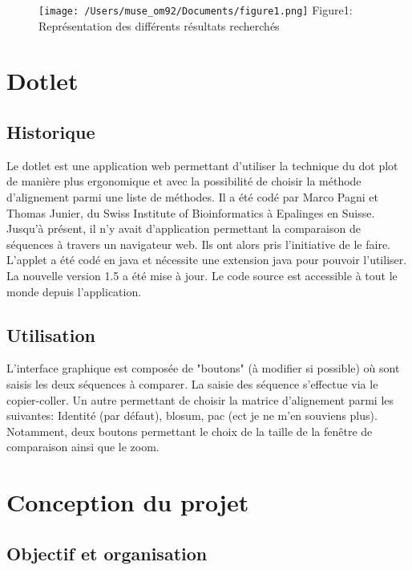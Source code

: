 \documentclass{report}
\begin{document}

\begin{figure}[!h]
\centering
\texttt{[image: /Users/muse\_om92/Documents/figure1.png]}
Figure1: Représentation des différents résultats recherchés
\end{figure}


\chapter{Dotlet}

\section{Historique}

Le dotlet est une application web permettant d'utiliser la technique du dot plot de manière plus ergonomique et avec la possibilité de choisir la méthode d'alignement parmi une liste de méthodes. 
Il a été codé par Marco Pagni et Thomas Junier, du Swiss Institute of Bioinformatics à Epalinges en Suisse. Jusqu'à présent, il n'y avait d'application permettant la comparaison de séquences à travers un navigateur web. Ils ont alors pris l'initiative de le faire.
L'applet a été codé en java et nécessite une extension java pour pouvoir l'utiliser. La nouvelle version 1.5 a été mise à jour. Le code source est accessible à tout le monde depuis l'application.


\section{Utilisation}

L'interface graphique est composée de "boutons" (à modifier si possible) où sont saisis les deux séquences à comparer. La saisie des séquence s'effectue via le copier-coller. Un autre permettant de choisir la matrice d'alignement parmi les suivantes: Identité (par défaut), blosum, pac (ect je ne m'en souviens plus). Notamment, deux boutons permettant le choix de la taille de la fenêtre de comparaison ainsi que le zoom. 

\chapter{Conception du projet}

\section{Objectif et organisation}
\end{document}
